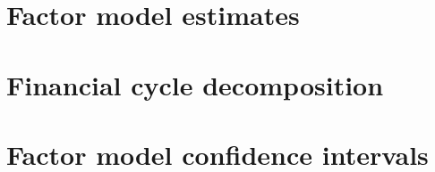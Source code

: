 \documentclass[a4paper,12pt]{article}
\begin{document}
\newpage



\newpage
\appendix
\section{Factor model estimates\label{AppendixA}}
\section{Financial cycle decomposition\label{AppendixB}}
\section{Factor model confidence intervals\label{AppendixC}}
\end{document}
